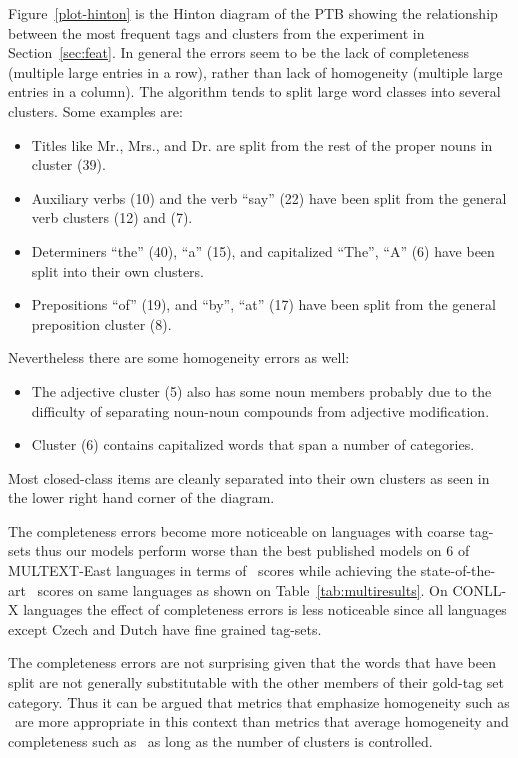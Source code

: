 Figure~\ref{plot-hinton} is the Hinton diagram of the PTB showing the
relationship between the most frequent tags and clusters from the
experiment in Section~\ref{sec:feat}.  In general the errors seem to
be the lack of completeness (multiple large entries in a row), rather
than lack of homogeneity (multiple large entries in a column).  The
algorithm tends to split large word classes into several clusters.
Some examples are:
\begin{itemize}
\item Titles like Mr., Mrs., and Dr. are split from the rest of the
  proper nouns in cluster (39).
\item Auxiliary verbs (10) and the verb ``say'' (22) have been split
  from the general verb clusters (12) and (7).
\item Determiners ``the'' (40), ``a'' (15), and capitalized
  ``The'', ``A'' (6) have been split into their own clusters.
\item Prepositions ``of'' (19), and ``by'', ``at'' (17) have been
  split from the general preposition cluster (8).
\end{itemize}
Nevertheless there are some homogeneity errors as well:
\begin{itemize} 
\item The adjective cluster (5) also has some noun members probably
  due to the difficulty of separating noun-noun compounds from
  adjective modification.
\item Cluster (6) contains capitalized words that span a number of
  categories.
\end{itemize}
Most closed-class items are cleanly separated into their own clusters
as seen in the lower right hand corner of the diagram. 

The completeness errors become more noticeable on languages with
coarse tag-sets thus our models perform worse than the best published
models on 6 of MULTEXT-East languages in terms of \vm\ scores while
achieving the state-of-the-art \mto\ scores on same languages as shown
on Table~\ref{tab:multiresults}.  On CONLL-X languages the effect of
completeness errors is less noticeable since all languages except
Czech and Dutch have fine grained tag-sets.

The completeness errors are not surprising given that the words that
have been split are not generally substitutable with the other members
of their gold-tag set category.  Thus it can be argued that metrics
that emphasize homogeneity such as \mto\ are more appropriate in this
context than metrics that average homogeneity and completeness such as
\vm\ as long as the number of clusters is controlled.

